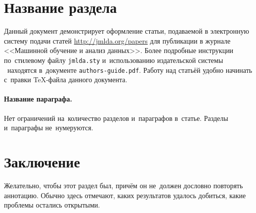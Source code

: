 \documentclass[12pt,twoside]{article}
\begin{document}
\section{Название раздела}
Данный документ демонстрирует оформление статьи,
подаваемой в электронную систему подачи статей \url{http://jmlda.org/papers} для публикации в журнале <<Машинной обучение и анализ данных>>.
Более подробные инструкции по~стилевому файлу \texttt{jmlda.sty}
и~использованию издательской системы \LaTeXe\
находятся в~документе \texttt{authors-guide.pdf}.
Работу над статьёй удобно начинать с~правки \TeX-файла данного документа.

\paragraph{Название параграфа.}
Нет ограничений на~количество разделов и~параграфов в~статье.
Разделы и~параграфы не~нумеруются.


\section{Заключение}
Желательно, чтобы этот раздел был, причём он не~должен дословно повторять аннотацию.
Обычно здесь отмечают,
каких результатов удалось добиться,
какие проблемы остались открытыми.



{}


\end{document}
